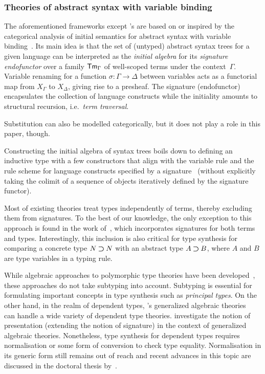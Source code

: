 \subsubsection{Theories of abstract syntax with variable binding}\label{sec:theory-of-syntax}
The aforementioned frameworks except \citeauthor{Gheri2020}'s are based on or inspired by the categorical analysis of initial semantics for abstract syntax with variable binding~\cite{Fiore1999}.
Its main idea is that the set of (untyped) abstract syntax trees for a given language can be interpreted as the \emph{initial algebra} for its \emph{signature endofunctor} over a family $\mathsf{Tm}_{\Gamma}$ of well-scoped terms under the context~$\Gamma$.
Variable renaming for a function $\sigma\colon \Gamma \to \Delta$ between variables acts as a functorial map from $X_{\Gamma}$ to $X_{\Delta}$, giving rise to a presheaf.
The signature (endofunctor) encapsulates the collection of language constructs while the initiality amounts to structural recursion, i.e.\ \emph{term traversal}.

Substitution can also be modelled categorically, but it does not play a role in this paper, though.

\begin{remark}
Constructing the initial algebra of syntax trees boils down to defining an inductive type with a few constructors that align with the variable rule and the rule scheme for language constructs specified by a signature~\citep{Allais2021,Fiore2022} (without explicitly taking the colimit of a sequence of objects iteratively defined by the signature functor).
\end{remark}

\begin{remark} \label{re:type-signature}
Most of existing theories treat types independently of terms, thereby excluding them from signatures.
To the best of our knowledge, the only exception to this approach is found in the work of~\citet{Arkor2020}, which incorporates signatures for both terms and types.
Interestingly, this inclusion is also critical for type synthesis for comparing a concrete type $N \mathbin{\bm{\supset}} N$ with an abstract type $A \mathbin{\bm{\supset}} B$, where $A$ and $B$ are type variables in a typing rule.
\end{remark}

While algebraic approaches to polymorphic type theories have been developed~\citep{Fiore2013,Hamana2011}, these approaches do not take subtyping into account.
Subtyping is essential for formulating important concepts in type synthesis such as \emph{principal types}.
On the other hand, in the realm of dependent types, \citeauthor{Cartmell1986}'s generalized algebraic theories~\citeyearpar{Cartmell1986} can handle a wide variety of dependent type theories.
\citet{Bezem2021} investigate the notion of presentation (extending the notion of signature) in the context of generalized algebraic theories.
Nonetheless, type synthesis for dependent types requires normalisation or some form of conversion to check type equality.
Normalisation in its generic form still remains out of reach and recent advances in this topic are discussed in the doctoral thesis by~\citet{Valliappan2023}.

